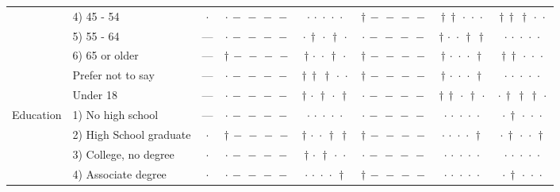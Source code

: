 {\begin{longtable}[t]{llcccccc}
 & 4) 45 - 54 & $\cdot$ & ${\cdot}\,{-}\,{-}\,{-}\,{-}$ & ${\cdot}\,{\cdot}\,{\cdot}\,{\cdot}\,{\cdot}$ & ${\dagger}\,{-}\,{-}\,{-}\,{-}$ & ${\dagger}\,{\dagger}\,{\cdot}\,{\cdot}\,{\cdot}$ & ${\dagger}\,{\dagger}\,{\dagger}\,{\cdot}\,{\cdot}$ \\
 & 5) 55 - 64 & --- & ${\cdot}\,{-}\,{-}\,{-}\,{-}$ & ${\cdot}\,{\dagger}\,{\cdot}\,{\dagger}\,{\cdot}$ & ${\cdot}\,{-}\,{-}\,{-}\,{-}$ & ${\dagger}\,{\cdot}\,{\cdot}\,{\dagger}\,{\dagger}$ & ${\cdot}\,{\cdot}\,{\cdot}\,{\cdot}\,{\cdot}$ \\
 & 6) 65 or older & --- & ${\dagger}\,{-}\,{-}\,{-}\,{-}$ & ${\dagger}\,{\cdot}\,{\cdot}\,{\dagger}\,{\cdot}$ & ${\dagger}\,{-}\,{-}\,{-}\,{-}$ & ${\dagger}\,{\cdot}\,{\cdot}\,{\cdot}\,{\dagger}$ & ${\dagger}\,{\dagger}\,{\cdot}\,{\cdot}\,{\cdot}$ \\
 & Prefer not to say & --- & ${\cdot}\,{-}\,{-}\,{-}\,{-}$ & ${\dagger}\,{\dagger}\,{\dagger}\,{\cdot}\,{\cdot}$ & ${\dagger}\,{-}\,{-}\,{-}\,{-}$ & ${\dagger}\,{\cdot}\,{\cdot}\,{\cdot}\,{\dagger}$ & ${\cdot}\,{\cdot}\,{\cdot}\,{\cdot}\,{\cdot}$ \\
 & Under 18 & --- & ${\cdot}\,{-}\,{-}\,{-}\,{-}$ & ${\dagger}\,{\cdot}\,{\dagger}\,{\cdot}\,{\dagger}$ & ${\cdot}\,{-}\,{-}\,{-}\,{-}$ & ${\dagger}\,{\dagger}\,{\cdot}\,{\dagger}\,{\cdot}$ & ${\cdot}\,{\dagger}\,{\dagger}\,{\dagger}\,{\cdot}$ \\
\cline{1-8}
\multirow[t]{10}{*}{Education} & 1) No high school & --- & ${\cdot}\,{-}\,{-}\,{-}\,{-}$ & ${\cdot}\,{\cdot}\,{\cdot}\,{\cdot}\,{\cdot}$ & ${\cdot}\,{-}\,{-}\,{-}\,{-}$ & ${\cdot}\,{\cdot}\,{\cdot}\,{\cdot}\,{\cdot}$ & ${\cdot}\,{\dagger}\,{\cdot}\,{\cdot}\,{\cdot}$ \\
 & 2) High School graduate & $\cdot$ & ${\dagger}\,{-}\,{-}\,{-}\,{-}$ & ${\dagger}\,{\cdot}\,{\cdot}\,{\dagger}\,{\dagger}$ & ${\dagger}\,{-}\,{-}\,{-}\,{-}$ & ${\cdot}\,{\cdot}\,{\cdot}\,{\cdot}\,{\dagger}$ & ${\cdot}\,{\dagger}\,{\cdot}\,{\cdot}\,{\dagger}$ \\
 & 3) College, no degree & $\cdot$ & ${\cdot}\,{-}\,{-}\,{-}\,{-}$ & ${\dagger}\,{\cdot}\,{\dagger}\,{\cdot}\,{\cdot}$ & ${\cdot}\,{-}\,{-}\,{-}\,{-}$ & ${\cdot}\,{\cdot}\,{\cdot}\,{\cdot}\,{\cdot}$ & ${\cdot}\,{\cdot}\,{\cdot}\,{\cdot}\,{\cdot}$ \\
 & 4) Associate degree & $\cdot$ & ${\cdot}\,{-}\,{-}\,{-}\,{-}$ & ${\cdot}\,{\cdot}\,{\cdot}\,{\cdot}\,{\dagger}$ & ${\dagger}\,{-}\,{-}\,{-}\,{-}$ & ${\cdot}\,{\cdot}\,{\cdot}\,{\cdot}\,{\cdot}$ & ${\cdot}\,{\dagger}\,{\cdot}\,{\cdot}\,{\cdot}$ \\

\end{longtable}}
